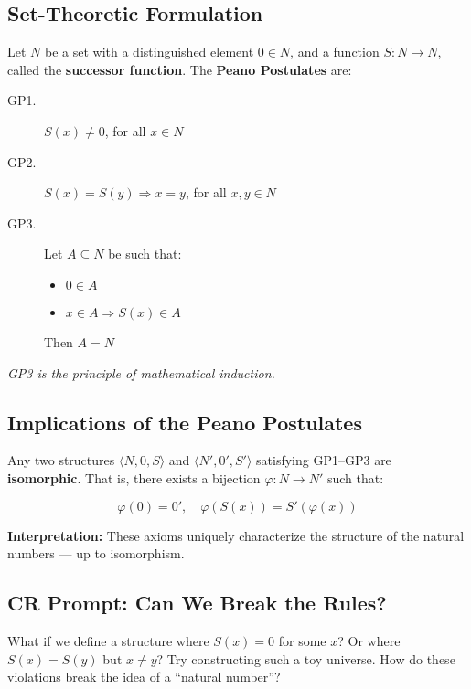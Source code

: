 \documentclass[12pt]{article}
\begin{document}
\subsection{Set-Theoretic Formulation}

Let \( N \) be a set with a distinguished element \( 0 \in N \), and a function \( S : N \to N \), called the \textbf{successor function}. The \textbf{Peano Postulates} are:

\begin{description}
  \item[GP1.] \( S(x) \neq 0 \), for all \( x \in N \)
  \item[GP2.] \( S(x) = S(y) \Rightarrow x = y \), for all \( x, y \in N \)
  \item[GP3.] Let \( A \subseteq N \) be such that:
    \begin{itemize}
      \item \( 0 \in A \)
      \item \( x \in A \Rightarrow S(x) \in A \)
    \end{itemize}
    Then \( A = N \)
\end{description}

\vspace{0.5em}
\textit{GP3 is the principle of mathematical induction.}

\subsection{Implications of the Peano Postulates}

Any two structures \( \langle N, 0, S \rangle \) and \( \langle N', 0', S' \rangle \) satisfying GP1–GP3 are \textbf{isomorphic}. That is, there exists a bijection \( \varphi : N \to N' \) such that:

\[
\varphi(0) = 0', \quad \varphi(S(x)) = S'(\varphi(x))
\]

\textbf{Interpretation:} These axioms uniquely characterize the structure of the natural numbers — up to isomorphism.

\subsection*{CR Prompt: Can We Break the Rules?}

What if we define a structure where \( S(x) = 0 \) for some \( x \)? Or where \( S(x) = S(y) \) but \( x \neq y \)? Try constructing such a toy universe. How do these violations break the idea of a ``natural number''?
\end{document}
